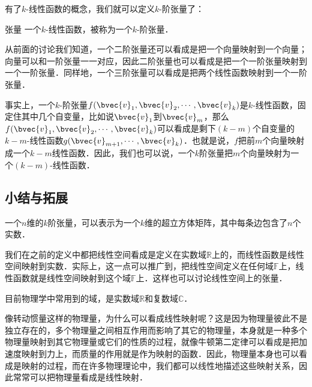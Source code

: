 有了$k$-线性函数的概念，我们就可以定义$k$-阶张量了：

\begin{definition}{张量}
一个$k$-线性函数，被称为一个$k$-阶张量．
\end{definition}

从前面的讨论我们知道，一个二阶张量还可以看成是把一个向量映射到一个向量；向量可以和一阶张量一一对应，因此二阶张量也可以看成是把一个一阶张量映射到一个一阶张量．同样地，一个三阶张量可以看成是把两个线性函数映射到一个一阶张量．

事实上，一个$k$-阶张量$f(\bvec{v}_1, \bvec{v}_2, \cdots,\bvec{v}_k)$是$k$-线性函数，固定住其中几个自变量，比如说$\bvec{v}_1$到$\bvec{v}_m$，那么$f(\bvec{v}_1, \bvec{v}_2,\cdots,\bvec{v}_k)$可以看成是剩下$(k-m)$个自变量的$k-m$-线性函数$g(\bvec{v}_{m+1}, \cdots,\bvec{v}_k)$．也就是说，$f$把前$m$个向量映射成一个$k-m$线性函数．因此，我们也可以说，一个$k$阶张量把$m$个向量映射为一个$(k-m)$-线性函数．

\subsection{小结与拓展}

一个$n$维的$k$阶张量，可以表示为一个$k$维的超立方体矩阵，其中每条边包含了$n$个实数．

我们在之前的定义中都把线性空间看成是定义在实数域$\mathbb{R}$上的，而线性函数是线性空间映射到实数．实际上，这一点可以推广到，把线性空间定义在任何域$\mathbb{F}$上，线性函数就是线性空间映射到这个域$\mathbb{F}$上．这样也可以讨论线性空间上的张量．

目前物理学中常用到的域，是实数域$\mathbb{R}$和复数域$\mathbb{C}$．

像转动惯量这样的物理量，为什么可以看成线性映射呢？这是因为物理量彼此不是独立存在的，多个物理量之间相互作用而影响了其它的物理量，本身就是一种多个物理量映射到其它物理量或它们的性质的过程，就像牛顿第二定律可以看成是把加速度映射到力上，而质量的作用就是作为映射的函数．因此，物理量本身也可以看成是映射的过程，而在许多物理理论中，我们都可以线性地描述这些映射关系，因此常常可以把物理量看成是线性映射．







